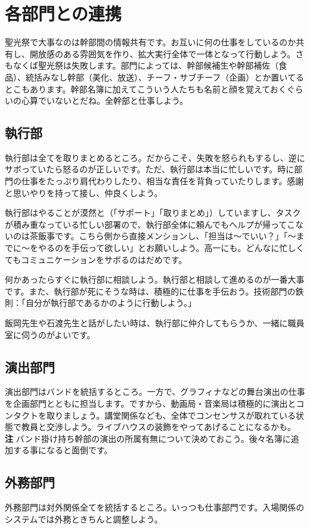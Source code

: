 \documentclass[a4paper]{ltjsreport}
\begin{document}
\section{各部門との連携}
聖光祭で大事なのは幹部間の情報共有です。お互いに何の仕事をしているのか共有し、開放感のある雰囲気を作り、拡大実行全体で一体となって行動しよう。さもなくば聖光祭は失敗します。部門によっては、幹部候補生や幹部補佐（食品）、統括みなし幹部（美化、放送）、チーフ・サブチーフ（企画）とか置いてるとこもあります。幹部名簿に加えてこういう人たちも名前と顔を覚えておくぐらいの心算でいないとだね。全幹部と仕事しよう。

\subsection{執行部}
執行部は全てを取りまとめるところ。だからこそ、失敗を怒られもするし、逆にサボっていたら怒るのが正しいです。ただ、執行部は本当に忙しいです。時に部門の仕事をたっぷり肩代わりしたり、相当な責任を背負っていたりします。感謝と思いやりを持って接し、仲良くしよう。

執行部はやることが漠然と（「サポート」「取りまとめ」）していますし、タスクが積み重なっている忙しい部署ので、執行部全体に頼んでもヘルプが帰ってこないのは茶飯事です。こちら側から直接メンションし、「担当は〜でいい？」「〜までに〜をやるのを手伝って欲しい」とお願いしよう。高一にも。どんなに忙しくてもコミュニケーションをサボるのはだめです。

何かあったらすぐに執行部に相談しよう。執行部と相談して進めるのが一番大事です。また、執行部が死にそうな時は、積極的に仕事を手伝おう。技術部門の鉄則：「自分が執行部であるかのように行動しよう。」

飯岡先生や石渡先生と話がしたい時は、執行部に仲介してもらうか、一緒に職員室に伺うのがよいです。

\subsection{演出部門}\label{sec:演出部門}
演出部門はバンドを統括するところ。一方で、グラフィナなどの舞台演出の仕事を企画部門とともに担当します。ですから、動画局・音楽局は積極的に演出とコンタクトを取りましょう。講堂関係なども、全体でコンセンサスが取れている状態で教員と交渉しよう。ライブハウスの装飾をやってあげることになるかも。\\
{\bfseries 注} バンド掛け持ち幹部の演出の所属有無について決めておこう。後々名簿に追加する事になると面倒です。

\subsection{外務部門}
外務部門は対外関係全てを統括するところ。いっつも仕事部門です。入場関係のシステムでは外務ときちんと調整しよう。
\end{document}
